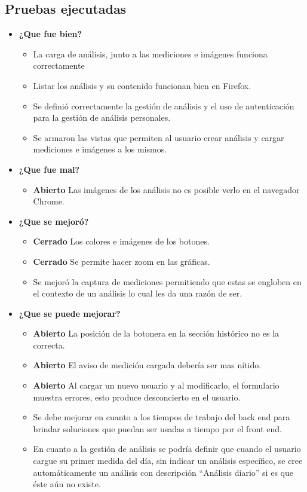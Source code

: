 \documentclass[a4paper,12pt]{article}
\begin{document}
\subsection{Pruebas ejecutadas}
	\begin{itemize}
		\item \textbf{¿Que fue bien?}
        	\begin{itemize}
				\item La carga de análisis, junto a las mediciones e imágenes funciona correctamente
				\item Listar los análisis y su contenido funcionan bien en Firefox.
				\item Se definió correctamente la gestión de análisis y el uso de autenticación para la gestión de análisis personales.
				\item Se armaron las vistas que permiten al usuario crear análisis y cargar mediciones e imágenes a los mismos.
			\end{itemize}
		\item \textbf{¿Que fue mal?}
		\begin{itemize}
			\item \textbf{Abierto} Las imágenes de los análisis no es posible verlo en el navegador Chrome.
			
		\end{itemize}
   		\item \textbf{¿Que se mejoró?}
        	\begin{itemize}
                \item \textbf{Cerrado} Los colores e imágenes de los botones.
                \item \textbf{Cerrado} Se permite hacer zoom en las gráficas.
                \item Se mejoró la captura de mediciones permitiendo que estas se engloben en el contexto de un análisis lo cual les da una razón de ser.
			\end{itemize}

   		\item \textbf{¿Que se puede mejorar?}
        	\begin{itemize}
		       \item \textbf{Abierto} La posición de la botonera en la sección histórico no es la correcta.
		       \item \textbf{Abierto}  El aviso de medición cargada debería ser mas nítido.
		       \item \textbf{Abierto} Al cargar un nuevo usuario y al modificarlo, el formulario muestra errores, esto produce desconcierto en el usuario.
		        \item Se debe mejorar en cuanto a los tiempos de trabajo del back end para brindar soluciones que puedan ser usadas a tiempo por el front end.
		        \item En cuanto a la gestión de análisis se podría definir que cuando el usuario cargue su primer medida del día, sin indicar un análisis específico, se cree automáticamente un análisis con descripción ``Análisis diario'' si es que éste aún no existe.
            \end{itemize}
        

	\end{itemize}
\clearpage
\end{document}
